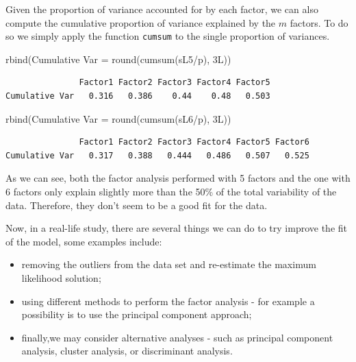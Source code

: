\documentclass[
  letterpaper,
  DIV=11,
  numbers=noendperiod]{scrartcl}
\newenvironment{Shaded}{\begin{snugshade}}{\end{snugshade}}
\newcommand{\AttributeTok}[1]{\textcolor[rgb]{0.40,0.45,0.13}{#1}}
\newcommand{\FunctionTok}[1]{\textcolor[rgb]{0.28,0.35,0.67}{#1}}
\newcommand{\NormalTok}[1]{\textcolor[rgb]{0.00,0.23,0.31}{#1}}
\newcommand{\OtherTok}[1]{\textcolor[rgb]{0.00,0.23,0.31}{#1}}
\newcommand{\SpecialCharTok}[1]{\textcolor[rgb]{0.37,0.37,0.37}{#1}}
\newcommand{\StringTok}[1]{\textcolor[rgb]{0.13,0.47,0.30}{#1}}
\providecommand{\tightlist}{%
  \setlength{\itemsep}{0pt}\setlength{\parskip}{0pt}}\usepackage{longtable,booktabs,array}
\begin{document}
Given the proportion of variance accounted for by each factor, we can
also compute the cumulative proportion of variance explained by the
\(m\) factors. To do so we simply apply the function \texttt{cumsum} to
the single proportion of variances.

\begin{Shaded}
\begin{Highlighting}[]
\FunctionTok{rbind}\NormalTok{(}\StringTok{\textasciigrave{}}\AttributeTok{Cumulative Var}\StringTok{\textasciigrave{}} \OtherTok{=} \FunctionTok{round}\NormalTok{(}\FunctionTok{cumsum}\NormalTok{(sL5}\SpecialCharTok{/}\NormalTok{p), 3L))}
\end{Highlighting}
\end{Shaded}

\begin{verbatim}
               Factor1 Factor2 Factor3 Factor4 Factor5
Cumulative Var   0.316   0.386    0.44    0.48   0.503
\end{verbatim}

\begin{Shaded}
\begin{Highlighting}[]
\FunctionTok{rbind}\NormalTok{(}\StringTok{\textasciigrave{}}\AttributeTok{Cumulative Var}\StringTok{\textasciigrave{}} \OtherTok{=} \FunctionTok{round}\NormalTok{(}\FunctionTok{cumsum}\NormalTok{(sL6}\SpecialCharTok{/}\NormalTok{p), 3L))}
\end{Highlighting}
\end{Shaded}

\begin{verbatim}
               Factor1 Factor2 Factor3 Factor4 Factor5 Factor6
Cumulative Var   0.317   0.388   0.444   0.486   0.507   0.525
\end{verbatim}

As we can see, both the factor analysis performed with 5 factors and the
one with 6 factors only explain slightly more than the 50\% of the total
variability of the data. Therefore, they don't seem to be a good fit for
the data.

Now, in a real-life study, there are several things we can do to try
improve the fit of the model, some examples include:

\begin{itemize}
\tightlist
\item
  removing the outliers from the data set and re-estimate the maximum
  likelihood solution;
\item
  using different methods to perform the factor analysis - for example a
  possibility is to use the principal component approach;
\item
  finally,we may consider alternative analyses - such as principal
  component analysis, cluster analysis, or discriminant analysis.
\end{itemize}
\end{document}
